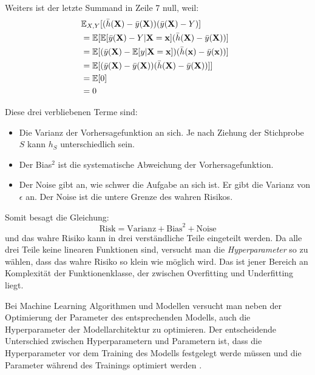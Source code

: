 Weiters ist der letzte Summand in Zeile 7 null, weil:
\begin{equation*}
	\begin{split}
		\lefteqn{ \mathbb{E}_{X, Y}[(\bar{h}(\mathbf{X})-\bar{y}(\mathbf{X}))(\bar{y}(\mathbf{X})-Y)] } \\\
		& = \mathbb{E}[\mathbb{E}[\bar{y}(\mathbf{X})-Y|\mathbf{X} = \mathbf{x}](\bar{h}(\mathbf{X})-\bar{y}(\mathbf{X}))] \\\
		& = \mathbb{E}[(\bar{y}(\mathbf{X})-\mathbb{E}[y|\mathbf{X} = \mathbf{x}])(\bar{h}(\mathbf{x})-\bar{y}(\mathbf{x}))] \\\
		& = \mathbb{E}[(\bar{y}(\mathbf{X})-\bar{y}(\mathbf{X}))(\bar{h}(\mathbf{X})-\bar{y}(\mathbf{X}))]] \\\
		& = \mathbb{E}[0]\\\
		& = 0
	\end{split}
\end{equation*}


Diese drei verbliebenen Terme sind:
\begin{itemize}
	\item Die Varianz der Vorhersagefunktion an sich. Je nach Ziehung der Stichprobe $S$ kann $h_S$ unterschiedlich sein.
	\item Der Bias$^2$ ist die systematische Abweichung der Vorhersagefunktion. %
	\item Der Noise gibt an, wie schwer die Aufgabe an sich ist. Er gibt die Varianz von $\epsilon$ an. Der Noise ist die untere Grenze des wahren Risikos.
\end{itemize}

Somit besagt die Gleichung:
$$ \text{Risk} = \text{Varianz} + \text{Bias}^2 + \text{Noise} $$
und das wahre Risiko kann in drei verst\"andliche Teile eingeteilt werden. Da alle drei Teile keine linearen Funktionen sind,
versucht man die \textit{Hyperparameter} so zu w\"ahlen, dass das wahre Risiko so klein wie
m\"oglich wird. Das ist jener Bereich an Komplexit\"at der Funktionenklasse, der zwischen Overfitting und Underfitting liegt.


Bei Machine Learning Algorithmen und Modellen versucht man neben der Optimierung der Parameter des entsprechenden Modells,
auch die Hyperparameter der Modellarchitektur zu optimieren. Der entscheidende Unterschied zwischen Hyperparametern
und Parametern ist, dass die Hyperparameter vor dem Training des Modells festgelegt werde m\"ussen und die Parameter w\"ahrend des Trainings
optimiert werden \cite{hyper}.


